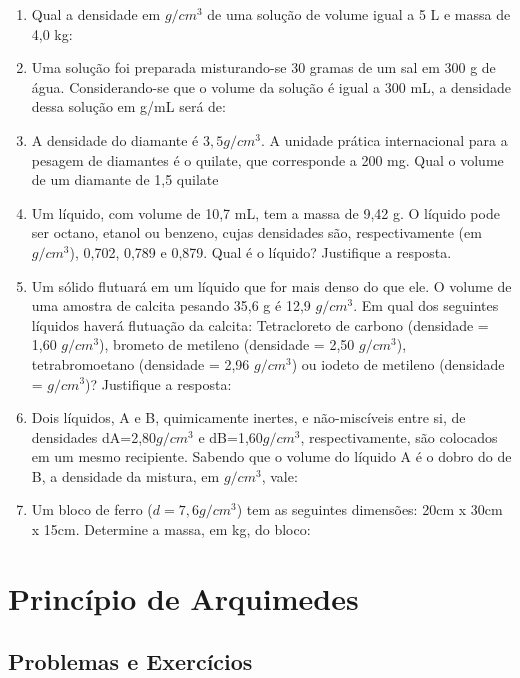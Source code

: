 \documentclass[12pt,a4paper]{book}
\begin{document}
\begin{enumerate}
		\item Qual a densidade em $g/cm^3$ de uma solução de volume igual a 5 L e massa de 4,0 kg:
		
		\item Uma solução foi preparada misturando-se 30 gramas de um sal em 300 g de água. Considerando-se que o volume da solução é igual a 300 mL, a densidade dessa solução em g/mL será de:
		
		\item A densidade do diamante é $3,5 g/cm^3$. A unidade prática internacional para a pesagem de diamantes é o quilate, que corresponde a 200 mg. Qual o volume de um diamante de 1,5 quilate
		
		\item Um líquido, com volume de 10,7 mL, tem a massa de 9,42 g. O líquido pode ser octano, etanol ou benzeno, cujas densidades são, respectivamente (em $g/cm^3$), 0,702, 0,789 e 0,879. Qual é o líquido? Justifique a resposta.
		
		\item Um sólido flutuará em um líquido que for mais denso do que ele. O volume de uma amostra de calcita pesando 35,6 g é 12,9 $g/cm^3$. Em qual dos seguintes líquidos haverá flutuação da calcita: Tetracloreto de carbono (densidade = 1,60 $g/cm^3$), brometo de metileno (densidade = 2,50 $g/cm^3$), tetrabromoetano (densidade = 2,96 $g/cm^3$) ou iodeto de metileno (densidade = $g/cm^3$)? Justifique a resposta:
		
		\item Dois líquidos, A e B, quimicamente inertes, e não-miscíveis entre si, de densidades dA=2,80$g/cm^3$ e dB=1,60$g/cm^3$, respectivamente, são colocados em um mesmo recipiente. Sabendo que o volume do líquido A é o dobro do de B, a densidade da mistura, em $g/cm^3$, vale:
		
		\item Um bloco de ferro ($d= 7,6 g/cm^3$) tem as seguintes dimensões: 20cm x 30cm x 15cm. Determine a massa, em kg, do bloco:
		\end{enumerate}
	
	
	\newpage \section{Princípio de Arquimedes}
		
		\newpage \subsection{Problemas e Exercícios}
		
\end{document}
